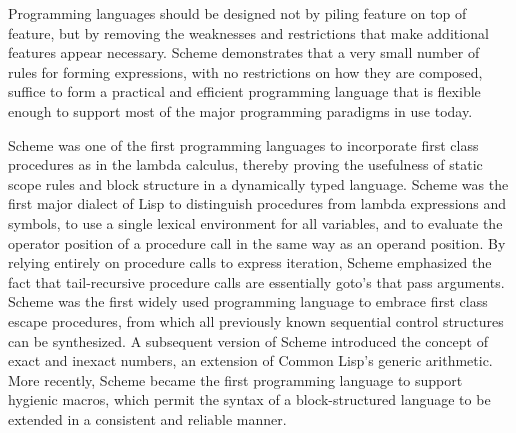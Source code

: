 
\label{historysection}

Programming languages should be designed not by piling feature on top of
feature, but by removing the weaknesses and restrictions that make additional
features appear necessary.  Scheme demonstrates that a very small number
of rules for forming expressions, with no restrictions on how they are
composed, suffice to form a practical and efficient programming language
that is flexible enough to support most of the major programming
paradigms in use today.

Scheme
was one of the first programming languages to incorporate first class
procedures as in the lambda calculus, thereby proving the usefulness of
static scope rules and block structure in a dynamically typed language.
Scheme was the first major dialect of Lisp to distinguish procedures
from lambda expressions and symbols, to use a single lexical
environment for all variables, and to evaluate the operator position
of a procedure call in the same way as an operand position.  By relying
entirely on procedure calls to express iteration, Scheme emphasized the
fact that tail-recursive procedure calls are essentially goto's that
pass arguments.  Scheme was the first widely used programming language to
embrace first class escape procedures, from which all previously known
sequential control structures can be synthesized.  A subsequent
version of Scheme introduced the concept of exact and inexact numbers,
an extension of Common Lisp's generic arithmetic.
More recently, Scheme became the first programming language to support
hygienic macros, which permit the syntax of a block-structured language
to be extended in a consistent and reliable manner.


